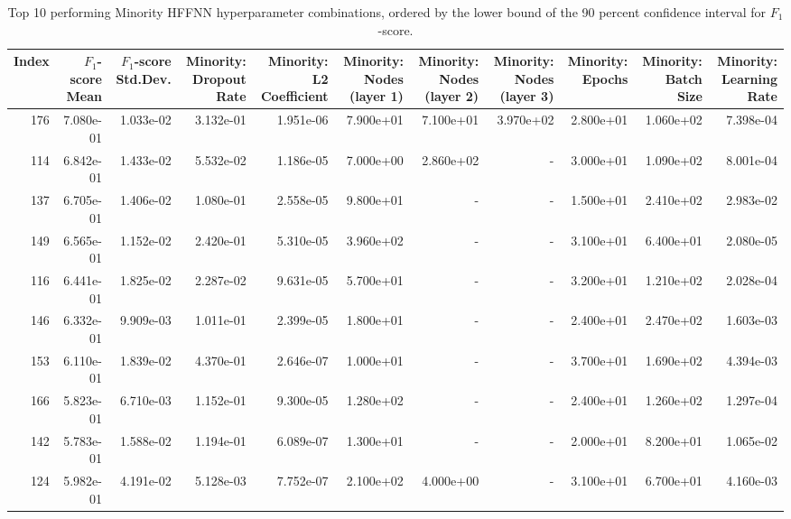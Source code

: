 \begin{table}
\caption{Top 10 performing Minority HFFNN hyperparameter combinations, ordered by the lower bound of the 90 percent confidence interval for $F_1$-score.}
\label{tab:05_best_minority_hffnn_hpars}
\begin{adjustbox}{width=1\textwidth}
\begin{tabular}{rrrrrrrrrrr}
\toprule
Index & $F_1$-score Mean & $F_1$-score Std.Dev. & Minority: Dropout Rate & Minority: L2 Coefficient & Minority: Nodes (layer 1) & Minority: Nodes (layer 2) & Minority: Nodes (layer 3) & Minority: Epochs & Minority: Batch Size & Minority: Learning Rate \\
\midrule
176 & 7.080e-01 & 1.033e-02 & 3.132e-01 & 1.951e-06 & 7.900e+01 & 7.100e+01 & 3.970e+02 & 2.800e+01 & 1.060e+02 & 7.398e-04 \\
114 & 6.842e-01 & 1.433e-02 & 5.532e-02 & 1.186e-05 & 7.000e+00 & 2.860e+02 & - & 3.000e+01 & 1.090e+02 & 8.001e-04 \\
137 & 6.705e-01 & 1.406e-02 & 1.080e-01 & 2.558e-05 & 9.800e+01 & - & - & 1.500e+01 & 2.410e+02 & 2.983e-02 \\
149 & 6.565e-01 & 1.152e-02 & 2.420e-01 & 5.310e-05 & 3.960e+02 & - & - & 3.100e+01 & 6.400e+01 & 2.080e-05 \\
116 & 6.441e-01 & 1.825e-02 & 2.287e-02 & 9.631e-05 & 5.700e+01 & - & - & 3.200e+01 & 1.210e+02 & 2.028e-04 \\
146 & 6.332e-01 & 9.909e-03 & 1.011e-01 & 2.399e-05 & 1.800e+01 & - & - & 2.400e+01 & 2.470e+02 & 1.603e-03 \\
153 & 6.110e-01 & 1.839e-02 & 4.370e-01 & 2.646e-07 & 1.000e+01 & - & - & 3.700e+01 & 1.690e+02 & 4.394e-03 \\
166 & 5.823e-01 & 6.710e-03 & 1.152e-01 & 9.300e-05 & 1.280e+02 & - & - & 2.400e+01 & 1.260e+02 & 1.297e-04 \\
142 & 5.783e-01 & 1.588e-02 & 1.194e-01 & 6.089e-07 & 1.300e+01 & - & - & 2.000e+01 & 8.200e+01 & 1.065e-02 \\
124 & 5.982e-01 & 4.191e-02 & 5.128e-03 & 7.752e-07 & 2.100e+02 & 4.000e+00 & - & 3.100e+01 & 6.700e+01 & 4.160e-03 \\
\bottomrule
\end{tabular}
\end{adjustbox}
\end{table}

